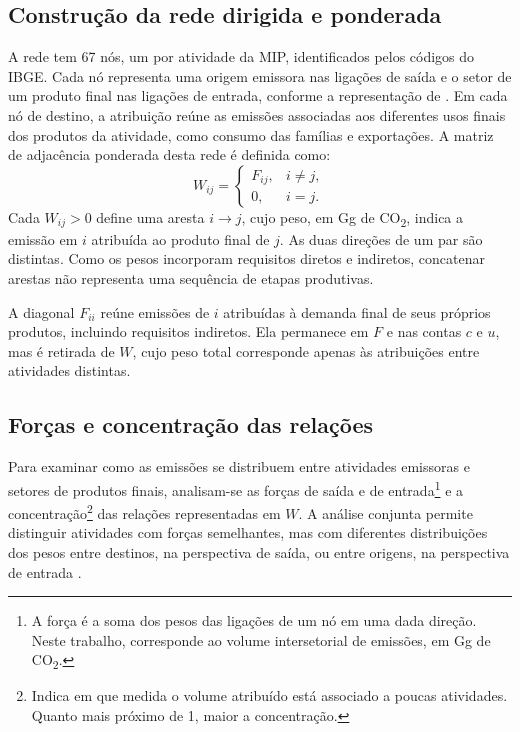 \subsection{Construção da rede dirigida e ponderada}
\label{sec:construcao-rede}

A rede tem 67 nós, um por atividade da MIP, identificados pelos códigos do IBGE. Cada nó representa uma origem emissora nas ligações de saída e o setor de um produto final nas ligações de entrada, conforme a representação de \textcite{huang2019}. Em cada nó de destino, a atribuição reúne as emissões associadas aos diferentes usos finais dos produtos da atividade, como consumo das famílias e exportações. A matriz de adjacência ponderada desta rede é definida como:
\begin{equation}
W_{ij}=\begin{cases}
F_{ij}, & i\ne j,\\
0, & i=j.
\end{cases}
\label{eq:rede-sem-diagonal}
\end{equation}
Cada $W_{ij}>0$ define uma aresta $i\rightarrow j$, cujo peso, em Gg de CO\textsubscript{2}, indica a emissão em $i$ atribuída ao produto final de $j$. As duas direções de um par são distintas. Como os pesos incorporam requisitos diretos e indiretos, concatenar arestas não representa uma sequência de etapas produtivas.

A diagonal $F_{ii}$ reúne emissões de $i$ atribuídas à demanda final de seus próprios produtos, incluindo requisitos indiretos. Ela permanece em $F$ e nas contas $c$ e $u$, mas é retirada de $W$, cujo peso total corresponde apenas às atribuições entre atividades distintas.

\subsection{Forças e concentração das relações}
\label{sec:volume-concentracao}

Para examinar como as emissões se distribuem entre atividades emissoras e setores de produtos finais, analisam-se as forças de saída e de entrada\footnote{A força é a soma dos pesos das ligações de um nó em uma dada direção. Neste trabalho, corresponde ao volume intersetorial de emissões, em Gg de CO\textsubscript{2}.} e a concentração\footnote{Indica em que medida o volume atribuído está associado a poucas atividades. Quanto mais próximo de 1, maior a concentração.} das relações representadas em $W$. A análise conjunta permite distinguir atividades com forças semelhantes, mas com diferentes distribuições dos pesos entre destinos, na perspectiva de saída, ou entre origens, na perspectiva de entrada \parencite{huang2019,serrano2009}.

